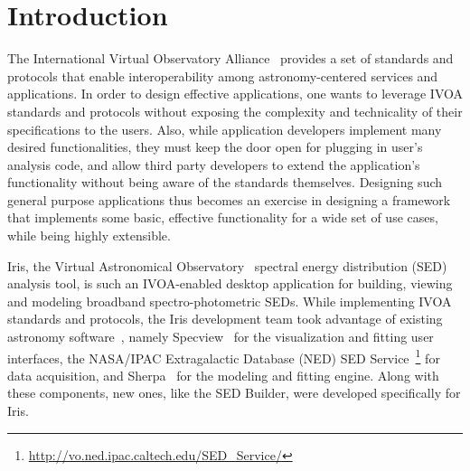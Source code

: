 \documentclass[final,5p,authoryear]{elsarticle}
\begin{document}
\label{sec:introduction} \section{Introduction} The International Virtual
Observatory Alliance~\citep[IVOA;][]{2004SPIE.5493..137Q} provides a set of
standards and protocols that enable interoperability among astronomy-centered
services and applications. In order to design effective applications, one wants
to leverage IVOA standards and protocols without exposing the complexity and
technicality of their specifications to the users. Also, while application
developers implement many desired functionalities, they must keep the door open
for plugging in user's analysis code, and allow third party developers to extend
the application's functionality without being aware of the standards themselves.
Designing such general purpose applications thus becomes an exercise in
designing a framework that implements some basic, effective functionality for a
wide set of use cases, while being highly extensible.


Iris, the Virtual Astronomical Observatory~\citep[VAO;][]{2012SPIE.8449E..0HB}
spectral energy distribution (SED) analysis tool, is such an IVOA-enabled
desktop application for building, viewing and modeling broadband
spectro-photometric SEDs. While implementing IVOA standards and protocols, the
Iris development team took advantage of existing astronomy
software~\citep{2012ASPC..461..893D,2013AAS...22124038L}, namely
Specview~\citep{2002ASPC..281..120B} for the visualization and fitting user
interfaces, the NASA/IPAC Extragalactic Database (NED) SED Service~\footnote{\url{http://vo.ned.ipac.caltech.edu/SED_Service/}} for data
acquisition, and Sherpa~\citep{2001SPIE.4477...76F} for the modeling and fitting
engine. Along with these components, new ones, like the SED Builder, were
developed specifically for Iris.


\end{document}
